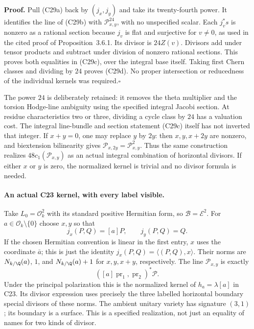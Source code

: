 \textbf{Proof.}
Pull (C29a) back by $(j_x,j_y)$ and take its twenty-fourth
power. It identifies the line of (C29b) with
$\mathcal P_{x,y}^{24}$, with no unspecified scalar.
Each $j_v^*s$ is nonzero as a rational section because
$j_v$ is flat and surjective for $v\ne0$, as used in
the cited proof of Proposition~3.6.1. Its divisor is
$24Z(v)$. Divisors add under tensor products and subtract
under division of nonzero rational sections. This proves
both equalities in (C29c), over the integral base itself.
Taking first Chern classes and dividing by $24$ proves
(C29d). No proper intersection or reducedness of the
individual kernels was required.\hfill$\square$

The power $24$ is deliberately retained: it removes the
theta multiplier and the torsion Hodge-line ambiguity
using the specified integral Jacobi section. At residue
characteristics two or three, dividing a cycle class by
$24$ has a valuation cost. The integral line-bundle and
section statement (C29c) itself has not inverted that
integer. If $x+y=0$, one may replace $y$ by $2y$:
then $x,y, x+2y$ are nonzero, and biextension bilinearity
gives $\mathcal P_{x,2y}=\mathcal P_{x,y}^2$.
Thus the same construction realizes $48c_1(\mathcal P_{x,y})$
as an actual integral combination of horizontal divisors.
If either $x$ or $y$ is zero, the normalized kernel is
trivial and no divisor formula is needed.

\paragraph{An actual C23 kernel, with every label visible.}
Take $L_0=\mathcal O_k^2$ with its standard positive
Hermitian form, so $\mathcal B=\mathcal E^2$. For
$a\in\mathcal O_k\setminus\{0\}$ choose $x,y$ so that
\[
       j_x(P,Q)=[a]P,\qquad j_y(P,Q)=Q.
\]
If the chosen Hermitian convention is linear in the first
entry, $x$ uses the coordinate $\bar a$; this is just the
identity $j_x(P,Q)=\langle(P,Q),x\rangle$.
Their norms are $N_{k/\Q}(a)$, $1$, and
$N_{k/\Q}(a)+1$ for $x,y,x+y$, respectively.
The line $\mathcal P_{x,y}$ is exactly
\[
                     ([a]\operatorname{pr}_1,
                           \operatorname{pr}_2)^*\mathcal P.
 \tag{C29e}
\]
Under the principal polarization this is the normalized
kernel of $h_a=\lambda[a]$ in C23. Its divisor expression
uses precisely the three labelled horizontal boundary
special divisors of these norms. The ambient unitary
variety has signature $(3,1)$; its boundary is a surface.
This is a specified realization, not just an equality of
names for two kinds of divisor.

